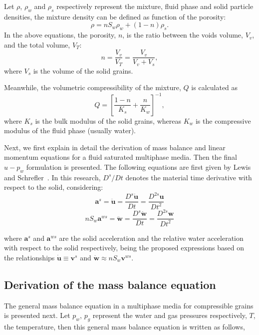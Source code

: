 \documentclass[twocolumn]{svjour3}          %
\begin{document}
Let $\rho$, $\rho_{w}$ and $\rho_{s}$ respectively represent the mixture, fluid phase and solid particle densities,   the mixture density can be  defined as function of the porosity:
\begin{equation}\label{eq_uw2}
\rho=n S_w \rho_{w}+(1-n) \rho_s.
\end{equation}
In the above equations, the porosity, $n$, is the ratio  between the voids volume, $V_v$, and the total volume, $V_T$:
\begin{equation}\label{eq_uw3}
n=\frac{V_v}{V_T}=\frac{V_v}{V_v+V_s},
\end{equation}
where $V_s$ is the volume of the solid grains.

Meanwhile, the volumetric compressibility of the mixture, $Q$ \cite{Zienkiewicz99} is calculated as
\begin{equation}\label{eq_uw4}
Q = \left[ \frac{1-n}{K_s} + \frac{n}{K_w} \right]^{-1},
\end{equation}
where $K_s$ is the bulk modulus of  the solid grains, whereas  $K_w$ is  the compressive modulus of the fluid phase (usually water).

Next, we first  explain in detail the derivation of mass balance and linear momentum equations for a fluid saturated multiphase media. Then the final $u-p_w$ formulation is presented. The following equations are first given by Lewis and Schrefler~\cite{LewisSchrefler98}. In this research, $D^s/Dt$ denotes the material time derivative with respect to the solid, considering:
$$
\boldsymbol{a}^s =  \ddot{\boldsymbol{u}} = \frac{D^s \dot{\boldsymbol{u}}}{Dt} = \frac{D^{2s} \boldsymbol{u}}{Dt^2}
$$
$$
n S_w \boldsymbol{a}^{ws} =  \ddot{\boldsymbol{w}} = \frac{D^s \dot{\boldsymbol{w}}}{Dt} = \frac{D^{2s} \boldsymbol{w}}{Dt^2}
$$

where  $\boldsymbol{a}^s$ and $\boldsymbol{a}^{ws}$ are the solid acceleration and the relative water acceleration with respect to the solid respectively, being the proposed expressions based on the relationships $\boldsymbol{\dot{u}} \equiv \boldsymbol{v}^{s}$ and $\boldsymbol{\dot{w}} \approx nS_w \boldsymbol{v}^{ws}$.


\subsection{Derivation of the mass balance equation}\label{subsec:21}
The general mass balance equation in a multiphase media for compressible grains is presented next. 
Let $p_w$, $p_g$ represent the water and gas pressures respectively, $T$, the temperature, %
then this general mass balance equation is written as follows,
\end{document}
